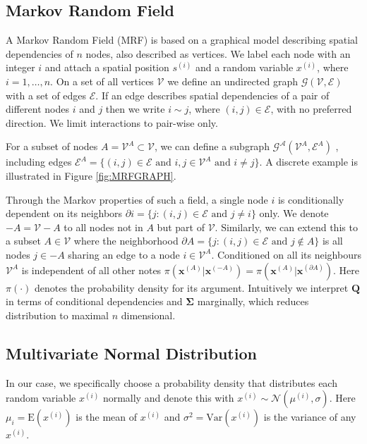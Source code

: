\subsection{Markov Random Field}
\label{subsec:MRF}
A Markov Random Field (MRF) is based on a graphical model describing spatial dependencies of $n$ nodes, also described as vertices.
We label each node with an integer $i$ and attach a spatial position $s^{(i)}$ and a random variable $x^{(i)}$, where $i = 1, \dots, n$.
On a set of all vertices $\mathcal{V}$ we define an undirected graph $\mathcal{G}(\mathcal{V},\mathcal{E})$ with a set of edges $\mathcal{E}$.
If an edge describes spatial dependencies of a pair of different nodes $i$ and $j$ then we write $i \sim j$, where $(i,j) \in \mathcal{E}$, with no preferred direction.
We limit interactions to pair-wise only.

For a subset of nodes $A = \mathcal{V}^A \subset \mathcal{V}$, we can define a subgraph $\mathcal{G}^\mathcal{A}(\mathcal{V}^A,\mathcal{E}^A)$ , including edges  $\mathcal{E}^A = \{ (i,j)\in \mathcal{E} \text{ and } i,j \in \mathcal{V}^A \text{ and } i \neq j \}$.
A discrete example is illustrated in Figure \ref{fig:MRFGRAPH}.


Through the Markov properties of such a field, a single node $i$ is conditionally dependent on its neighbors $\partial i = \{ j : (i,j) \in \mathcal{E} \text{ and } j \neq i   \}$ only.
We denote $-A = \mathcal{V} - A $ to all nodes not in $A$ but part of $\mathcal{V}$.
Similarly, we can extend this to a subset $A \in \mathcal{V}$ where the neighborhood $\partial A = \{ j : (i,j) \in \mathcal{E} \text{ and } j \notin A\}$ is all nodes $j \in -A$ sharing an edge to a node $ i \in \mathcal{V}^A$.
Conditioned on all its neighbours $\mathcal{V}^A$ is independent of all other notes $\pi(\bm{x}^{(A)}|\bm{x}^{(-A)}) = \pi(\bm{x}^{(A)}|\bm{x}^{(\partial A)}) $.
Here $\pi(\cdot)$ denotes the probability density for its argument.
Intuitively we interpret $\bm{Q}$ in terms of conditional dependencies and $\bm{\Sigma}$ marginally, which reduces distribution to maximal $n$ dimensional.

\subsection{Multivariate Normal Distribution}
\label{subsec:NormDist}
In our case, we specifically choose a probability density that distributes each random variable $x^{(i)}$ normally and denote this with $x^{(i)} \sim \mathcal{N}(\mu^{(i)}, \sigma)$.
Here $\mu_i = \text{E}(x^{(i)})$ is the mean of $x^{(i)}$ and $\sigma^2 = \text{Var}(x^{(i)}) $ is the variance of any $x^{(i)}$.

